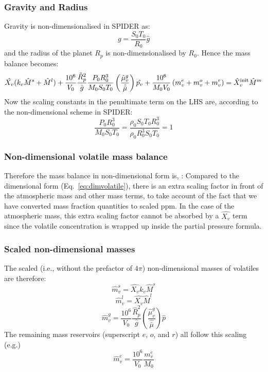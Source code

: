 \subsubsection{Gravity and Radius}
Gravity is non-dimensionalised in SPIDER as:
\begin{equation}
g = \frac{S_0 T_0}{R_0} \hat{g}
\end{equation}
and the radius of the planet $R_p$ is non-dimensionalised by $R_0$.  Hence the mass balance becomes:
\begin{equation}
\hat{X_v} (k_v \hat{M}^s + \hat{M}^l) + \frac{10^6}{V_0}\frac{\hat{R}_p^2}{\hat{g}}\frac{P_0 R_0^3}{M_0 S_0 T_0} \left( \frac{\hat{\mu}_v^g}{\hat{\bar{\mu}}} \right) \hat{p_v} + \frac{10^6}{M_0 V_0} \left( m_v^e + m_v^o + m_v^r \right) = \hat{X}_v^{\rm init} \hat{M}^m
\end{equation}
Now the scaling constants in the penultimate term on the LHS are, according to the non-dimensional scheme in SPIDER:
\begin{equation}
\frac{P_0 R_0^3}{M_0 S_0 T_0} = \frac{\rho_0 S_0 T_0 R_0^3}{\rho_0 R_0^3 S_0 T_0} = 1
\end{equation}
\subsubsection{Non-dimensional volatile mass balance}
Therefore the mass balance in non-dimensional form is, :
Compared to the dimensional form (Eq.~\ref{eq:dimvolatile}), there is an extra scaling factor in front of the atmospheric mass and other mass terms, to take account of the fact that we have converted mass fraction quantities to scaled ppm.  In the case of the atmospheric mass, this extra scaling factor cannot be absorbed by a $\hat{X_v}$ term since the volatile concentration is wrapped up inside the partial pressure formula.
\subsubsection{Scaled non-dimensional masses}
The scaled (i.e., without the prefactor of $4\pi$) non-dimensional masses of volatiles are therefore:
\begin{equation}
\hat{m}_v^s = \hat{X_v} k_v \hat{M}^s
\end{equation}
\begin{equation}
\hat{m}_v^l = \hat{X_v} \hat{M}^l
\end{equation}
\begin{equation}
\hat{m}_v^g = \frac{10^6}{V_0} \frac{\hat{R}_p^2}{\hat{g}} \left( \frac{\hat{\mu}_v^g}{\hat{\bar{\mu}}} \right) \hat{p}
\end{equation}
The remaining mass reservoirs (superscript $e$, $o$, and $r$) all follow this scaling (e.g.)
\begin{equation}
\hat{m}_v^e = \frac{10^6}{V_0} \frac{m_v^e}{M_0}
\end{equation}
